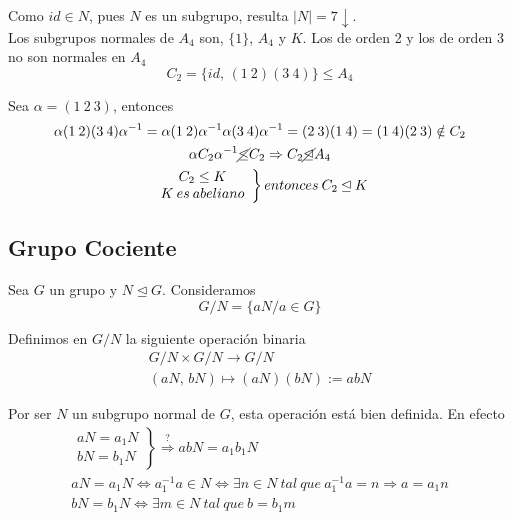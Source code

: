 \documentclass{article}
\begin{document}
Como $id\in N$, pues $N$ es un subgrupo, resulta $|N|=7 \downarrow$.\\

Los subgrupos normales de $A_4$ son, $\{1\}$, $A_4$ y $K$. Los de orden 2 y los de orden 3 no son normales en $A_4$
\begin{equation*}
C_2=\{id,\,(1\:2)(3\:4)\}\leq A_4
\end{equation*}

Sea $\alpha=(1\:2\:3)$, entonces
\begin{gather*}
\alpha(1\:2)(3\:4)\alpha^{-1}=\alpha(1\:2)\alpha^{-1}\alpha(3\:4)\alpha^{-1}=(2\:3)(1\:4)=(1\:4)(2\:3)\notin C_2 \\
\alpha C_2\alpha^{-1}\cancel{\leq} C_2\Rightarrow C_2 \cancel{\unlhd} A_4 \\
\left. \begin{array}{c}
C_2\leq K \\
K\:es\:abeliano
\end{array} \right\rbrace entonces\:C_2\unlhd K
\end{gather*}

\subsection{Grupo Cociente}

Sea $G$ un grupo y $N\unlhd G$. Consideramos
\begin{equation*}
G/N=\{aN/a\in G\}
\end{equation*}

Definimos en $G/N$ la siguiente operación binaria
\begin{gather*}
G/N\times G/N\longrightarrow G/N \\
(aN,\,bN)\longmapsto (aN)(bN):=abN
\end{gather*}

Por ser $N$ un subgrupo normal de $G$, esta operación está bien definida. En efecto
\begin{gather*}
\left. \begin{array}{c}
aN=a_1N \\
bN=b_1N
\end{array}\right\rbrace \overset{?}{\Rightarrow} abN=a_1b_1N \\
aN=a_1N\Leftrightarrow a_1^{-1}a\in N\Leftrightarrow \exists n\in N\:tal\:que\:a_1^{-1}a=n \Rightarrow a=a_1n \\
bN=b_1N\Leftrightarrow \exists m \in N\: tal\:que\:b=b_1m
\end{gather*}
\end{document}
